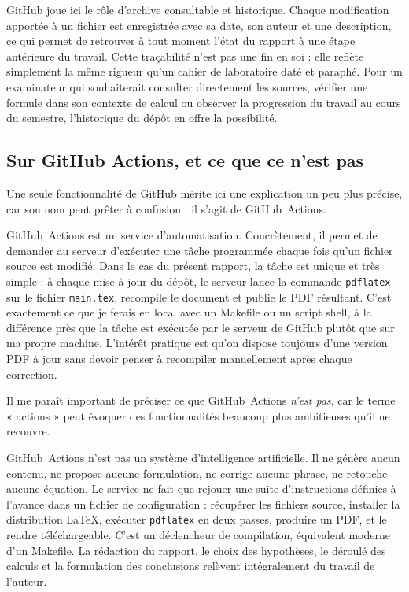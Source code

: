 GitHub joue ici le rôle d'archive consultable et historique. Chaque
modification apportée à un fichier est enregistrée avec sa date, son
auteur et une description, ce qui permet de retrouver à tout moment
l'état du rapport à une étape antérieure du travail. Cette traçabilité
n'est pas une fin en soi : elle reflète simplement la même rigueur
qu'un cahier de laboratoire daté et paraphé. Pour un examinateur qui
souhaiterait consulter directement les sources, vérifier une formule
dans son contexte de calcul ou observer la progression du travail au
cours du semestre, l'historique du dépôt en offre la possibilité.

\subsection*{Sur GitHub Actions, et ce que ce n'est pas}

Une seule fonctionnalité de GitHub mérite ici une explication un peu
plus précise, car son nom peut prêter à confusion : il s'agit de
GitHub~Actions.

GitHub~Actions est un service d'automatisation. Concrètement, il permet
de demander au serveur d'exécuter une tâche programmée chaque fois
qu'un fichier source est modifié. Dans le cas du présent rapport, la
tâche est unique et très simple : à chaque mise à jour du dépôt, le
serveur lance la commande \texttt{pdflatex} sur le fichier
\texttt{main.tex}, recompile le document et publie le PDF résultant.
C'est exactement ce que je ferais en local avec un Makefile ou un
script shell, à la différence près que la tâche est exécutée par le
serveur de GitHub plutôt que sur ma propre machine. L'intérêt pratique
est qu'on dispose toujours d'une version PDF à jour sans devoir penser
à recompiler manuellement après chaque correction.

Il me paraît important de préciser ce que GitHub~Actions \emph{n'est
pas}, car le terme « actions » peut évoquer des fonctionnalités
beaucoup plus ambitieuses qu'il ne recouvre.

GitHub~Actions n'est pas un système d'intelligence artificielle. Il ne
génère aucun contenu, ne propose aucune formulation, ne corrige aucune
phrase, ne retouche aucune équation. Le service ne fait que rejouer une
suite d'instructions définies à l'avance dans un fichier de
configuration : récupérer les fichiers source, installer la
distribution \LaTeX{}, exécuter \texttt{pdflatex} en deux passes,
produire un PDF, et le rendre téléchargeable. C'est un déclencheur de
compilation, équivalent moderne d'un Makefile. La rédaction du rapport,
le choix des hypothèses, le déroulé des calculs et la formulation des
conclusions relèvent intégralement du travail de l'auteur.

